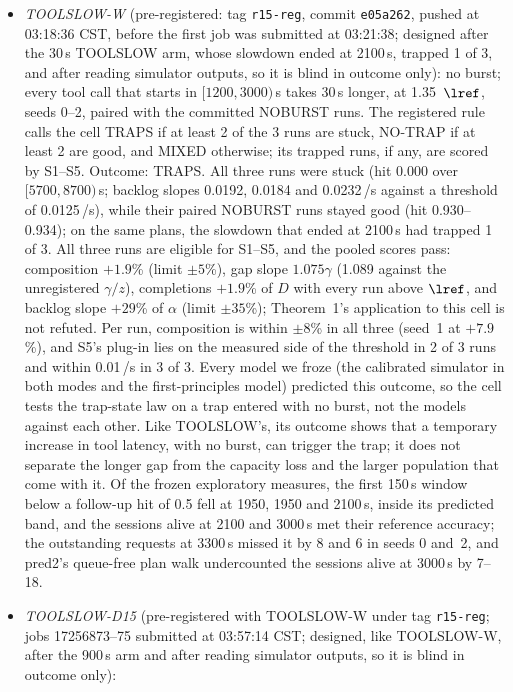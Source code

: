 \begin{itemize}[leftmargin=*,nosep]
\item \emph{TOOLSLOW-W} (pre-registered: tag \texttt{r15-reg}, commit \texttt{e05a262}, pushed at 03:18:36 CST, before the first job
was submitted at 03:21:38; designed after the 30\,s TOOLSLOW arm, whose slowdown ended at 2100\,s, trapped 1 of 3, and after
reading simulator outputs, so it is blind in outcome only): no burst; every tool call that starts in
$[1200,3000)$\,s takes 30\,s longer, at 1.35~$\lref$, seeds 0--2, paired with the committed NOBURST runs. The registered rule calls the
cell TRAPS if at least 2 of the 3 runs are stuck, NO-TRAP if at least 2 are good, and MIXED otherwise; its trapped runs, if any, are
scored by S1--S5. Outcome: TRAPS. All three runs were stuck (hit 0.000 over $[5700,8700)$\,s; backlog slopes 0.0192, 0.0184
and 0.0232\,/s against a threshold of 0.0125\,/s), while their paired NOBURST runs stayed good (hit 0.930--0.934); on the same
plans, the slowdown that ended at 2100\,s had trapped 1 of 3. All three runs are eligible for S1--S5, and the pooled scores pass:
composition $+1.9$\% (limit $\pm5$\%), gap slope $1.075\gamma$ (1.089 against the unregistered $\gamma/z$), completions $+1.9$\% of
$D$ with every run above $\lref$, and backlog slope $+29$\% of $\alpha$ (limit $\pm35$\%); Theorem~1's application to this cell is
not refuted. Per run, composition is within $\pm8$\% in all three (seed~1 at $+7.9$\%), and S5's plug-in lies on the measured side
of the threshold in 2 of 3 runs and within 0.01\,/s in 3 of 3. Every model we froze (the calibrated simulator in both modes and the
first-principles model) predicted this outcome, so the cell tests the trap-state law on a trap entered with no burst, not the models
against each other. Like TOOLSLOW's, its outcome shows that a temporary increase in tool latency, with no burst, can trigger the
trap; it does not separate the longer gap from the capacity loss and the larger population that come with it. Of the frozen
exploratory measures, the first 150\,s window below a follow-up hit of 0.5 fell at 1950, 1950 and 2100\,s, inside its predicted
band, and the sessions alive at 2100 and 3000\,s met their reference accuracy; the outstanding requests at 3300\,s missed it by 8 and
6 in seeds 0 and~2, and pred2's queue-free plan walk undercounted the sessions alive at 3000\,s by 7--18.
\item \emph{TOOLSLOW-D15} (pre-registered with TOOLSLOW-W under tag \texttt{r15-reg}; jobs 17256873--75 submitted at 03:57:14
CST; designed, like TOOLSLOW-W, after the 900\,s arm and after reading simulator outputs, so it is blind in outcome only):

\end{itemize}
